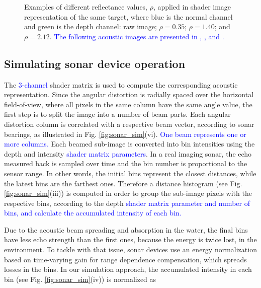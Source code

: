 \documentclass[final,5p,times]{elsarticle}
\begin{document}
\begin{figure}[!ht]
{        \label{fig:reflectance:view:2_12}
    }
    \captionsetup{justification=justified}
    \caption{Examples of different reflectance values, $\rho$, applied in
    shader image representation of the same target, where blue is the normal channel and
    green is the depth channel:  raw image;
     $\rho = 0.35$;
     $\rho = 1.40$; and
     $\rho = 2.12$. \textcolor{blue}{The following
    acoustic images are presented in ,
    , 
    and .}}
    \label{fig:sonar_reflectances}
\end{figure}



\subsection{Simulating sonar device operation}
\label{dev:sonardata}

The \textcolor{blue}{3-channel} shader matrix is used to compute the corresponding
acoustic representation. Since the angular distortion is radially spaced
over the horizontal field-of-view, where all pixels in the same column
have the same angle value, the first step is to split the image into a
number of beam parts. Each angular distortion column is correlated with a respective beam vector,
according to sonar bearings, as illustrated in Fig. \ref{fig:sonar_sim}(vi).
\textcolor{blue}{One beam represents one or more columns.} Each
beamed sub-image is converted into bin intensities using the depth and
intensity \textcolor{blue}{shader matrix parameters}. In a real imaging sonar, the echo
measured back is sampled
over time and the bin number is proportional to the sensor range. In other
words, the initial bins represent the closest distances, while the latest
bins are the farthest ones. Therefore a distance histogram (see Fig. \ref{fig:sonar_sim}(iii)) is computed in order to
group the sub-image pixels with the respective bins, according to the
depth \textcolor{blue}{shader matrix parameter and number of bins,
and calculate the accumulated intensity of each bin.}

Due to the acoustic beam spreading and absorption in the water, the final
bins have less echo strength than the first ones, because the energy is
twice lost, in the environment. To tackle with that issue, sonar devices
use an energy normalization based on time-varying gain for range dependence
compensation, which spreads losses in the bins. In our simulation approach,
the accumulated intensity in each bin (see Fig. \ref{fig:sonar_sim}(iv)) is normalized as
\end{document}
